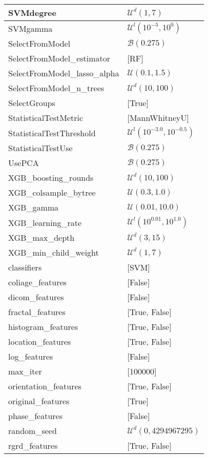 \begin{table}[]
\begin{tabular}{l|l}
SVMdegree & $\mathcal{U}^d(1, 7)$ \\ \hline
SVMgamma & $\mathcal{U}^l(10^{-5}, 10^{0})$ \\ \hline
SelectFromModel & $\mathcal{B}(0.275)$ \\ \hline
SelectFromModel\_estimator & {[RF]} \\ \hline
SelectFromModel\_lasso\_alpha & $\mathcal{U}(0.1, 1.5)$ \\ \hline
SelectFromModel\_n\_trees & $\mathcal{U}^d(10, 100)$ \\ \hline
SelectGroups & {[True]} \\ \hline
StatisticalTestMetric & {[MannWhitneyU]} \\ \hline
StatisticalTestThreshold & $\mathcal{U}^l(10^{-3.0}, 10^{-0.5})$ \\ \hline
StatisticalTestUse & $\mathcal{B}(0.275)$ \\ \hline
UsePCA & $\mathcal{B}(0.275)$ \\ \hline
XGB\_boosting\_rounds & $\mathcal{U}^d(10, 100)$ \\ \hline
XGB\_colsample\_bytree & $\mathcal{U}(0.3, 1.0)$ \\ \hline
XGB\_gamma & $\mathcal{U}(0.01, 10.0)$ \\ \hline
XGB\_learning\_rate & $\mathcal{U}^l(10^{0.01}, 10^{1.0})$ \\ \hline
XGB\_max\_depth & $\mathcal{U}^d(3, 15)$ \\ \hline
XGB\_min\_child\_weight & $\mathcal{U}^d(1, 7)$ \\ \hline
classifiers & {[SVM]} \\ \hline
coliage\_features & {[False]} \\ \hline
dicom\_features & {[False]} \\ \hline
fractal\_features & {[True, False]} \\ \hline
histogram\_features & {[True, False]} \\ \hline
location\_features & {[True, False]} \\ \hline
log\_features & {[False]} \\ \hline
max\_iter & {[100000]} \\ \hline
orientation\_features & {[True, False]} \\ \hline
original\_features & {[True]} \\ \hline
phase\_features & {[False]} \\ \hline
random\_seed & $\mathcal{U}^d(0, 4294967295)$ \\ \hline
rgrd\_features & {[True, False]} \\ \hline

\end{tabular}
\end{table}
